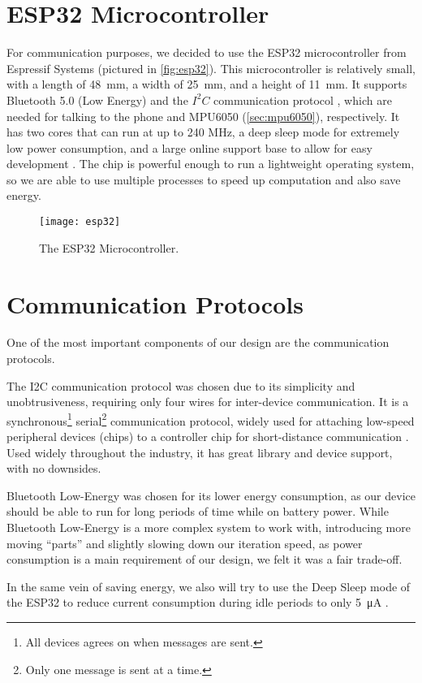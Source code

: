 \section{ESP32 Microcontroller}

For communication purposes, we decided to use the ESP32 microcontroller from
Espressif Systems (pictured in \autoref{fig:esp32}). This microcontroller is
relatively small, with a length of \qty{48}{\mm}, a width of \qty{25}{\mm}, and
a height of \qty{11}{\mm}. It supports Bluetooth 5.0 (Low Energy) and the
$I^2C$ communication protocol \cite{esp32}, which are needed for talking to the
phone and MPU6050 (\autoref{sec:mpu6050}), respectively. It has two cores that
can run at up to 240 MHz, a deep sleep mode for extremely low power
consumption, and a large online support base to allow for easy development
\cite{esp32}. The chip is powerful enough to run a lightweight operating
system, so we are able to use multiple processes to speed up computation and
also save energy.

\begin{figure}[h]
  \centering
  \texttt{[image: esp32]}
  \caption[ESP32 Microcontroller]{The ESP32 Microcontroller.}
  \label{fig:esp32}
\end{figure}

\section{Communication Protocols}

One of the most important components of our design are the communication
protocols.

The I2C communication protocol was chosen due to its simplicity and
unobtrusiveness, requiring only four wires for inter-device communication. It is
a synchronous\footnote{All devices agrees on when messages are sent.}
serial\footnote{Only one message is sent at a time.} communication protocol,
widely used for attaching low-speed peripheral devices (chips) to a controller
chip for short-distance communication \cite{i2c}. Used widely throughout the
industry, it has great library and device support, with no downsides.

Bluetooth Low-Energy was chosen for its lower energy consumption, as our device
should be able to run for long periods of time while on battery power. While
Bluetooth Low-Energy is a more complex system to work with, introducing more
moving ``parts'' and slightly slowing down our iteration speed, as power
consumption is a main requirement of our design, we felt it was a fair
trade-off.

In the same vein of saving energy, we also will try to use the Deep
Sleep mode of the ESP32 to reduce current consumption during idle periods to only
\qty{5}{\uA} \cite{esp32}.

